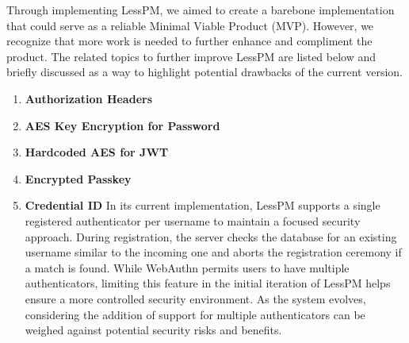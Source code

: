 Through implementing LessPM, we aimed to create a barebone implementation that could serve as a reliable Minimal
    Viable Product (MVP). However, we recognize that more work is needed to further enhance and compliment the product.
    The related topics to further improve LessPM are listed below and briefly discussed as a way to highlight
    potential drawbacks of the current version.

    \begin{enumerate}[label=$\blacktriangleright$]
        \item \textbf{Authorization Headers}
        \item \textbf{AES Key Encryption for Password}
        \item \textbf{Hardcoded AES for JWT}
        \item \textbf{Encrypted Passkey}
        \item \textbf{Credential ID} \newline In its current implementation, LessPM supports a single registered
        authenticator per username to maintain a focused security approach.
        During registration, the server checks the database for an existing username similar to the incoming one
        and aborts the registration ceremony if a match is found.
        While WebAuthn permits users to have multiple authenticators, limiting this feature in the initial iteration of
        LessPM helps ensure a more controlled security environment.
        As the system evolves, considering the addition of support for multiple authenticators can be weighed against
        potential security risks and benefits.
    \end{enumerate}